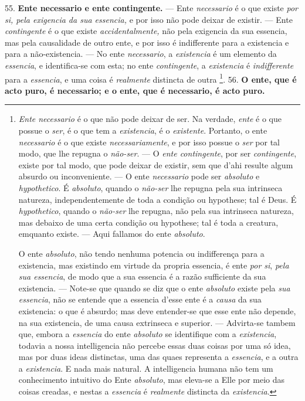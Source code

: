  55. \textbf{Ente necessario e ente contingente.} --- Ente \emph{necessario} é o que existe \emph{por si, pela exigencia da sua essencia,} e por isso não pode deixar de existir. --- Ente \emph{contingente} é o que existe \emph{accidentalmente,} não pela exigencia da sua essencia, mas pela causalidade de outro ente, e por isso é indifferente para a existencia e para a não-existencia. --- No ente \emph{necessario}, a \emph{existencia} é um elemento da \emph{essencia}, e identifica-se com esta; no ente \emph{contingente}, a \emph{existencia} é \emph{indifferente} para a \emph{essencia}, e uma coisa é \emph{realmente} distincta de outra \footnote{\emph{Ente necessario} é o que não pode deixar de ser. Na verdade, \emph{ente} é o que possue o \emph{ser}, é o que tem a \emph{existencia}, é o \emph{existente}. Portanto, o ente \emph{necessario} é o que existe \emph{necessariamente}, e por isso possue o \emph{ser} por tal modo, que lhe repugna o \emph{não-ser}. --- O \emph{ente contingente}, por ser \emph{contingente}, existe por tal modo, que pode deixar de existir, sem que d'ahi resulte algum absurdo ou inconveniente. --- O ente \emph{necessario} pode ser \emph{absoluto} e \emph{hypothetico}. É \emph{absoluto}, quando o \emph{não-ser} lhe repugna pela sua intrinseca natureza, independentemente de toda a condição ou hypothese; tal é Deus. É \emph{hypothetico}, quando o \emph{não-ser} lhe repugna, não pela sua intrinseca natureza, mas debaixo de uma certa condição ou hypothese; tal é toda a creatura, emquanto existe. --- Aqui fallamos do ente \emph{absoluto}.\par O ente \emph{absoluto}, não tendo nenhuma potencia ou indifferença para a existencia, mas existindo em virtude da propria essencia, é ente \emph{por si}, \emph{pela sua essencia}, de modo que a sua essencia é a razão sufficiente da sua existencia. --- Note-se que quando se diz que o ente \emph{absoluto} existe pela \emph{sua essencia}, não se entende que a essencia d'esse ente é a \emph{causa} da sua existencia: o que é absurdo; mas deve entender-se que esse ente não depende, na sua existencia, de uma causa extrinseca e superior. --- Advirta-se tambem que, embora a \emph{essencia} do ente \emph{absoluto} se identifique com a \emph{existencia}, todavia a nossa intelligencia não percebe essas duas coisas por uma só idea, mas por duas ideas distinctas, uma das quaes representa a \emph{essencia}, e a outra a \emph{existencia}. E nada mais natural. A intelligencia humana não tem um conhecimento intuitivo do Ente \emph{absoluto}, mas eleva-se a Elle por meio das coisas creadas, e nestas a \emph{essencia} é \emph{realmente} distincta da \emph{existencia}.}.
 56. \textbf{O ente, que é acto puro, é necessario; e o ente, que é necessario, é acto puro.}

